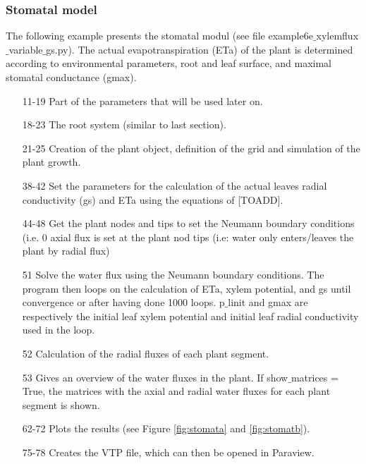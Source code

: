 \subsubsection*{Stomatal model} \label{ssec:stomatal}

The following example presents the stomatal modul (see file example6e$\_$xylemflux$\_$variable$\_$gs.py). The actual evapotranspiration (ETa) of the plant is determined according to environmental parameters, root and leaf surface, and maximal stomatal conductance (gmax). 
%
\begin{itemize}

\item[11-19] Part of the parameters that will be used later on.

\item[18-23] The root system (similar to last section). 

\item[21-25] Creation of the plant object, definition of the grid and simulation of the plant growth.

\item[38-42] Set the parameters for the calculation of the actual leaves radial conductivity (gs) and ETa using the equations of [TOADD].

\item[44-48] Get the plant nodes and tips to set the Neumann boundary conditions (i.e. 0 axial flux is set at the plant nod tips (i.e: water only enters/leaves the plant by radial flux)

\item[51] Solve the water flux using the Neumann boundary conditions. The program then loops on the calculation of ETa, xylem potential, and gs until convergence or after having done 1000 loops. p$\_$linit and gmax are respectively the initial leaf xylem potential and initial leaf radial conductivity used in the loop.

\item[52] Calculation of the radial fluxes of each plant segment.

\item[53] Gives an overview of the water fluxes in the plant. If show$\_$matrices = True, the matrices with the axial and radial water fluxes for each plant segment is shown.

\item[62-72] Plots the results (see Figure \ref{fig:stomata} and \ref{fig:stomatb}).

\item[75-78] Creates the VTP file, which can then be opened in Paraview.

\end{itemize}

